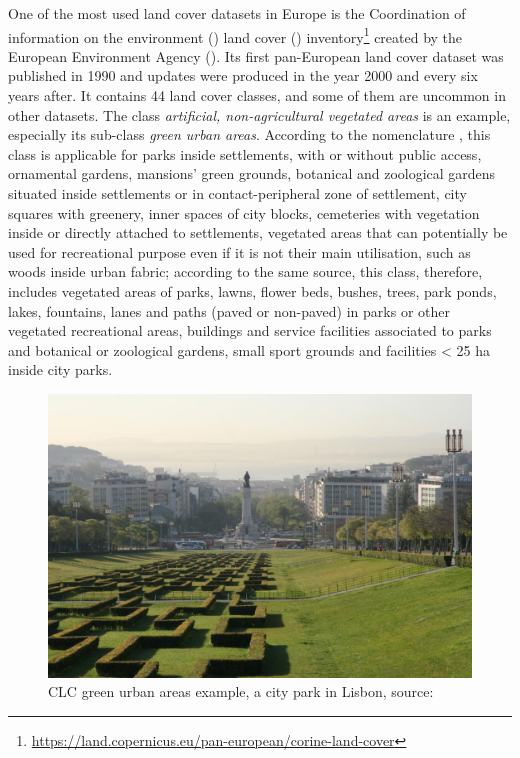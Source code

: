One of the most used land cover datasets in Europe is the Coordination of information on the environment () land cover () inventory\footnote{\url{https://land.copernicus.eu/pan-european/corine-land-cover}} created by the European Environment Agency (). Its first pan-European land cover dataset was published in 1990 and updates were produced in the year 2000 and every six years after. It contains 44 land cover classes, and some of them are uncommon in other datasets. The class \textit{artificial, non-agricultural vegetated areas} is an example, especially its sub-class \textit{green urban areas}. According to the  nomenclature \cite{clc-nomenclature}, this class is applicable for parks inside settlements, with or without public access, ornamental gardens, mansions’ green grounds, botanical and zoological gardens situated inside settlements or in contact-peripheral zone of settlement, city squares with greenery, inner spaces of city blocks, cemeteries with vegetation inside or directly attached to settlements, vegetated areas that can potentially be used for recreational purpose even if it is not their main utilisation, such as woods inside urban fabric; according to the same source, this class, therefore, includes vegetated areas of parks, lawns, flower beds, bushes, trees, park ponds, lakes, fountains, lanes and paths (paved or non-paved) in parks or other vegetated recreational areas, buildings and service facilities associated to parks and botanical or zoological gardens, small sport grounds and facilities < 25 ha inside city parks.

\begin{figure}[h]
   \centering
	\includegraphics[width=0.6\linewidth]{./pictures/urban-vegetation-clc-01.png}
	\caption[CLC green urban areas example, city park]{CLC green urban areas example, a city park in Lisbon, source: \cite{clc-nomenclature}}
      \label{fig-urban-green-1}
\end{figure}

